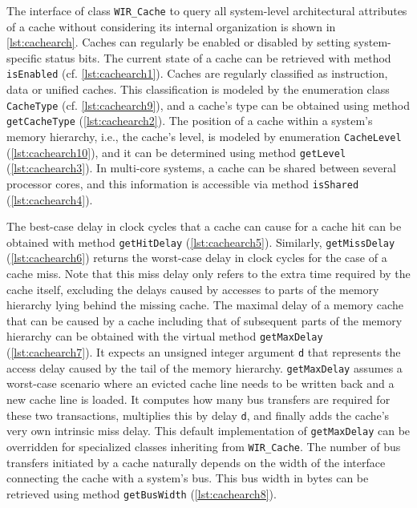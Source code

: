 The interface of class \texttt{WIR\_Cache} to query all system-level architectural attributes of a cache without considering its internal organization is shown in \cref{lst:cachearch}.
Caches can regularly be enabled or disabled by setting system-specific status bits.
The current state of a cache can be retrieved with method \texttt{isEnabled} (cf. \cref{lst:cachearch1}).
Caches are regularly classified as instruction, data or unified caches.
This classification is modeled by the enumeration class \texttt{CacheType} (cf. \cref{lst:cachearch9}), and a cache's type can be obtained using method \texttt{getCacheType} (\cref{lst:cachearch2}).
The position of a cache within a system's memory hierarchy, i.e., the cache's level, is modeled by enumeration \texttt{CacheLevel} (\cref{lst:cachearch10}), and it can be determined using method \texttt{getLevel} (\cref{lst:cachearch3}).
In multi-core systems, a cache can be shared between several processor cores, and this information is accessible via method \texttt{isShared} (\cref{lst:cachearch4}).

The best-case delay in clock cycles that a cache can cause for a cache hit can be obtained with method \texttt{getHit\-Delay} (\cref{lst:cachearch5}).
Similarly, \texttt{getMissDelay} (\cref{lst:cachearch6}) returns the worst-case delay in clock cycles for the case of a cache miss.
Note that this miss delay only refers to the extra time required by the cache itself, excluding the delays caused by accesses to parts of the memory hierarchy lying behind the missing cache.
The maximal delay of a memory cache that can be caused by a cache including that of subsequent parts of the memory hierarchy can be obtained with the virtual method \texttt{getMaxDelay} (\cref{lst:cachearch7}).
It expects an unsigned integer argument \texttt{d} that represents the access delay caused by the tail of the memory hierarchy.
\texttt{getMaxDelay} assumes a worst-case scenario where an evicted cache line needs to be written back and a new cache line is loaded.
It computes how many bus transfers are required for these two transactions, multiplies this by delay \texttt{d}, and finally adds the cache's very own intrinsic miss delay.
This default implementation of \texttt{getMaxDelay} can be overridden for specialized classes inheriting from \texttt{WIR\_Cache}.
The number of bus transfers initiated by a cache naturally depends on the width of the interface connecting the cache with a system's bus.
This bus width in bytes can be retrieved using method \texttt{getBusWidth} (\cref{lst:cachearch8}).

